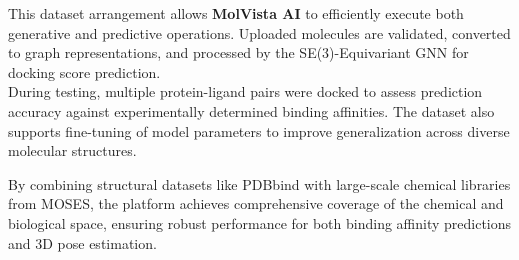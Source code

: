 \documentclass[12pt,a4]{report}
\begin{document}
\vspace{0.3cm}
\hspace{0.3in}
This dataset arrangement allows \textbf{MolVista AI} to efficiently execute both generative and predictive operations. Uploaded molecules are validated, converted to graph representations, and processed by the SE(3)-Equivariant GNN for docking score prediction.\\

\hspace{0.3in}
During testing, multiple protein-ligand pairs were docked to assess prediction accuracy against experimentally determined binding affinities. The dataset also supports fine-tuning of model parameters to improve generalization across diverse molecular structures.

\hspace{0.3in}
By combining structural datasets like PDBbind with large-scale chemical libraries from MOSES, the platform achieves comprehensive coverage of the chemical and biological space, ensuring robust performance for both binding affinity predictions and 3D pose estimation.\\
\end{document}
